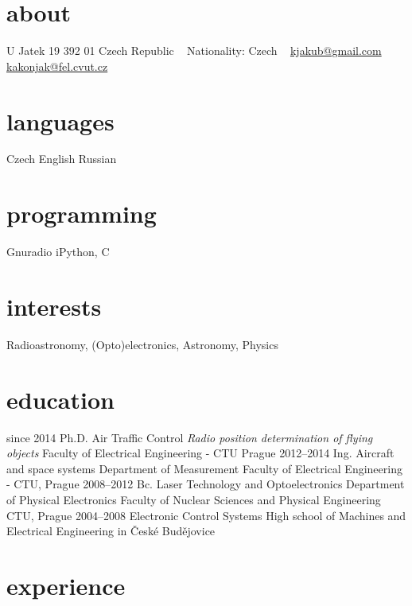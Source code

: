 \documentclass[]{friggeri-cv}
\begin{document}
       {}


\begin{aside}
  \section{about}
    U Jatek 19
    392 01
    Czech Republic
    ~
    Nationality:
    Czech
    ~
    \href{mailto:kjakub@gmail.com}{kjakub@gmail.com}
    \href{mailto:kakonjak@fel.cvut.cz}{kakonjak@fel.cvut.cz}
  \section{languages}
    Czech
    English
    Russian
  \section{programming}
    Gnuradio
    iPython, C
\end{aside}

\section{interests}

Radioastronomy, (Opto)electronics, Astronomy, Physics

\section{education}

\begin{entrylist}
  \entry
    {since 2014}
    {Ph.D. {\normalfont Air Traffic Control}}
    {\emph{Radio position determination of flying objects}}
    { Faculty of Electrical Engineering - CTU Prague}
  \entry
    {2012–2014}
    {Ing. Aircraft and space systems}
    {Department of Measurement}
    { Faculty of Electrical Engineering - CTU, Prague}
  \entry
    {2008–2012}
    {Bc. Laser Technology and Optoelectronics}
    {Department of Physical Electronics}
    {Faculty of Nuclear Sciences and Physical Engineering CTU, Prague}
  \entry
    {2004–2008}
    {Electronic Control Systems}
    {}
    {High school of Machines and Electrical Engineering in České Budějovice}
\end{entrylist}

\section{experience}
\end{document}
